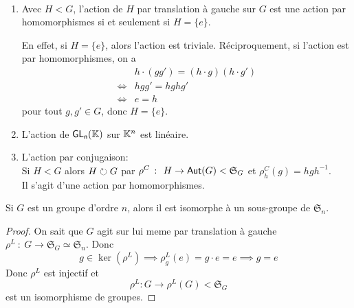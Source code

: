 \begin{example}\ 
    \begin{enumerate}
        \item Avec \(H < G\), l'action de \(H\) par translation à gauche sur \(G\) est
        une action par homomorphismes si et seulement si \(H = \{e\}\).

        En effet, si \(H = \{e\}\), alors l'action est triviale. Réciproquement, si
        l'action est par homomorphismes, on a
        \begin{equation*}
            \begin{aligned}
                & h \cdot (gg') = (h \cdot g)(h \cdot g')\\
                \iff & hgg' = hghg'\\
                \iff & e = h
            \end{aligned}
        \end{equation*}
        pour tout \(g,g'\in G\), donc \(H = \{e\}\).

        \item L'action de \(\operatorname{\mathsf{GL_{n}}}(\mathbb{K})\) sur \(\mathbb{K}^n\) est linéaire.

        \item L'action par conjugaison:\\
        Si \(H < G\) alors \(H\circlearrowright G\) par \(\rho^C\ \colon\ H\to\operatorname{\mathsf{Aut}}(G) < {\mathfrak{S}}_G\)
        et \(\rho^C_h(g) = hgh^{-1}\).\\
        Il s'agit d'une action par homomorphismes.
    \end{enumerate}
\end{example}

\begin{theorem}[de Cayley]
    Si \(G\) est un groupe d'ordre \(n\), alors il est isomorphe à un sous-groupe
    de \({\mathfrak{S}}_n\).
\end{theorem}

\begin{proof}
    On sait que \(G\) agit sur lui meme par translation à gauche
    \(\rho^L\ \colon\ G\to{\mathfrak{S}}_G \simeq {\mathfrak{S}}_n\). 
    Donc
    \begin{equation*}
        g\in \ker(\rho^L) \implies \rho^L_g(e) = g\cdot e = e \implies g = e
    \end{equation*}
    Donc \(\rho^L\) est injectif et
    \begin{equation*}
        \rho^L : G \to \rho^L(G) < {\mathfrak{S}}_G
    \end{equation*}
    est un isomorphisme de groupes.
\end{proof}

